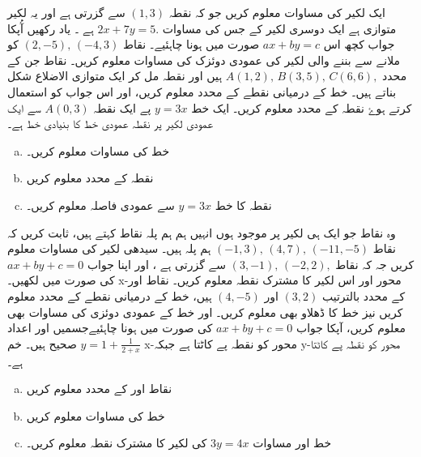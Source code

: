 ایک لکیر کی مساوات معلوم کریں جو کہ نقطہ \( (1,3) \) سے گزرتی ہے اور یہ لکیر متوازی ہے ایک دوسری لکیر کے جس کی مساوات \(2x+7y=5. \) ہے ۔ یاد رکھیں آُپکا جواب کچھ اس \(ax+by=c \) صورت میں ہونا چاہئیے۔
 نقاط \( (2,-5), \, (-4,3) \) کو ملانے سے بننے والی لکیر کی عمودی دوئزک کی مساوات معلوم کریں۔
نقاط جن کے محدد \( A(1,2), \, B(3,5), \, C(6,6), \) ہیں اور نقطہ  مل کر ایک متوازی الاضلاع شکل بناتے ہیں۔ خط  کے درمیانی نقطے کے محدد معلوم کریں، اور اس جواب کو استعمال کرتے ہوۓ نقطہ  کے محدد معلوم کریں۔  
ایک خط \(y=3x\) پے ایک نقطہ \(A(0,3) \) سے ایک عمودی لکیر پر نقطہ   عمودی خط کا بنیادی خط ہے۔
\begin{multicols}{2}
 \begin{enumerate}[a.]
\item
خط کی مساوات معلوم کریں۔ 
\item
نقطہ کے محدد معلوم کریں 
\item
نقطہ  کا خط  \(y=3x\) سے عمودی فاصلہ معلوم کریں۔
\end{enumerate}
\end{multicols}
وہ نقاط جو ایک ہی لکیر پر موجود ہوں انہیں ہم ہم پلہ نقاط کہتے ہیں، ثابت کریں کہ نقاط \( (-1,3), \, (4,7), \, (-11,-5) \) ہم پلہ ہیں۔
سیدھی لکیر کی مساوات معلوم کریں جہ کہ نقاط \( (3,-1), \, (-2,2), \) سے گزرتی ہے ، اور اپنا جواب \(ax+by+c=0 \) کی صورت میں لکھیں۔ x-محور اور اس لکیر کا مشترک نقطہ معلوم کریں۔
نقاط  اور کے محدد بالترتیب \( (3,2)\)  اور  \((4,-5) \) ہیں، خط  کے درمیانی نقطے کے محدد معلوم کریں نیز خط  کا ڈھلاو بھی معلوم کریں۔
اور خط  کے عمودی دوئزی کی مساوات بھی معلوم کریں، آپکا جواب \(ax+by+c=0 \) کی صورت میں ہونا چاہئیےجسمیں   اور  اعداد صحیح ہیں۔  
خم \( y= 1 + \frac{1}{2+x} \) x-محور کو نقطہ  پے کاٹتا ہے جبکہ y-محور کو نقطہ پے کاٹتا ہے۔
\begin{multicols}{2}
 \begin{enumerate}[a.]
\item  
نقاط  اور  کے محدد معلوم کریں
\item
خط  کی مساوات معلوم کریں 
\item
خط  اور مساوات \( 3y=4x \) کی لکیر کا مشترک نقطہ معلوم کریں۔
\end{enumerate}
\end{multicols}

